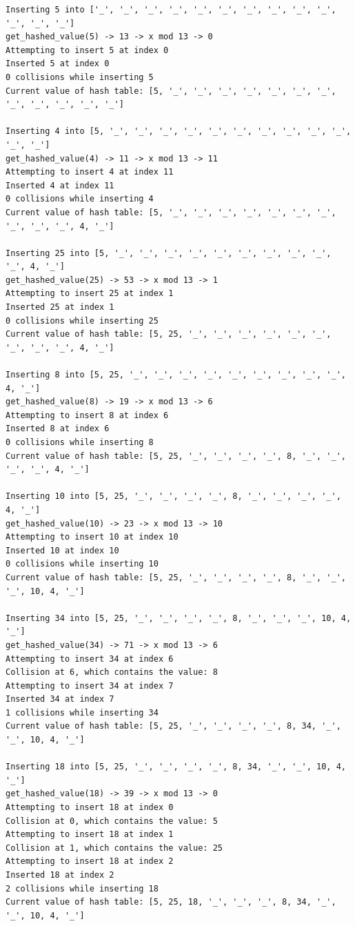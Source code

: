 \documentclass[10pt,letterpaper,final]{report}
\begin{document}
\begin{verbatim}
Inserting 5 into ['_', '_', '_', '_', '_', '_', '_', '_', '_', '_', '_', '_', '_']
get_hashed_value(5) -> 13 -> x mod 13 -> 0
Attempting to insert 5 at index 0
Inserted 5 at index 0
0 collisions while inserting 5
Current value of hash table: [5, '_', '_', '_', '_', '_', '_', '_', '_', '_', '_', '_', '_']

Inserting 4 into [5, '_', '_', '_', '_', '_', '_', '_', '_', '_', '_', '_', '_']
get_hashed_value(4) -> 11 -> x mod 13 -> 11
Attempting to insert 4 at index 11
Inserted 4 at index 11
0 collisions while inserting 4
Current value of hash table: [5, '_', '_', '_', '_', '_', '_', '_', '_', '_', '_', 4, '_']

Inserting 25 into [5, '_', '_', '_', '_', '_', '_', '_', '_', '_', '_', 4, '_']
get_hashed_value(25) -> 53 -> x mod 13 -> 1
Attempting to insert 25 at index 1
Inserted 25 at index 1
0 collisions while inserting 25
Current value of hash table: [5, 25, '_', '_', '_', '_', '_', '_', '_', '_', '_', 4, '_']

Inserting 8 into [5, 25, '_', '_', '_', '_', '_', '_', '_', '_', '_', 4, '_']
get_hashed_value(8) -> 19 -> x mod 13 -> 6
Attempting to insert 8 at index 6
Inserted 8 at index 6
0 collisions while inserting 8
Current value of hash table: [5, 25, '_', '_', '_', '_', 8, '_', '_', '_', '_', 4, '_']

Inserting 10 into [5, 25, '_', '_', '_', '_', 8, '_', '_', '_', '_', 4, '_']
get_hashed_value(10) -> 23 -> x mod 13 -> 10
Attempting to insert 10 at index 10
Inserted 10 at index 10
0 collisions while inserting 10
Current value of hash table: [5, 25, '_', '_', '_', '_', 8, '_', '_', '_', 10, 4, '_']

Inserting 34 into [5, 25, '_', '_', '_', '_', 8, '_', '_', '_', 10, 4, '_']
get_hashed_value(34) -> 71 -> x mod 13 -> 6
Attempting to insert 34 at index 6
Collision at 6, which contains the value: 8
Attempting to insert 34 at index 7
Inserted 34 at index 7
1 collisions while inserting 34
Current value of hash table: [5, 25, '_', '_', '_', '_', 8, 34, '_', '_', 10, 4, '_']

Inserting 18 into [5, 25, '_', '_', '_', '_', 8, 34, '_', '_', 10, 4, '_']
get_hashed_value(18) -> 39 -> x mod 13 -> 0
Attempting to insert 18 at index 0
Collision at 0, which contains the value: 5
Attempting to insert 18 at index 1
Collision at 1, which contains the value: 25
Attempting to insert 18 at index 2
Inserted 18 at index 2
2 collisions while inserting 18
Current value of hash table: [5, 25, 18, '_', '_', '_', 8, 34, '_', '_', 10, 4, '_']


\end{verbatim}
\end{document}
